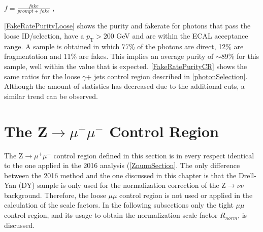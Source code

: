 \\

\begingroup
	\large
	\begin{center}
		$f = \frac{fake}{prompt+fake}$ ,
	\end{center}
\endgroup
\vspace{1em}

\autoref{FakeRatePurityLoose} shows the purity and fakerate for photons that pass the loose ID/selection, have a $p_\text{T} > 200$ GeV and are within the ECAL acceptance range. A sample is obtained in which 77\% of the photons are direct, 12\% are fragmentation and 11\% are fakes. This implies an average purity of $\sim$89\% for this sample, well within the value that is expected. \autoref{FakeRatePurityCR} shows the same ratios for the loose $\gamma$+ jets control region described in \autoref{photonSelection}. Although the amount of statistics has decreased due to the additional cuts, a similar trend can be observed.

\section{The Z$\rightarrow\mu^{+}\mu^{-}$ Control Region}

The Z$\rightarrow\mu^{+}\mu^{-}$ control region defined in this section is in every respect identical to the one applied in the 2016 analysis (\autoref{ZnunuSection}. The only difference between the 2016 method and the one discussed in this chapter is that the Drell-Yan (DY) sample is only used for the normalization correction of the Z$\rightarrow\nu\bar{\nu}$ background. Therefore, the loose $\mu\mu$ control region is not used or applied in the calculation of the scale factors. In the following subsections only the tight $\mu\mu$ control region, and its usage to obtain the normalization scale factor $R_{norm}$, is discussed.

